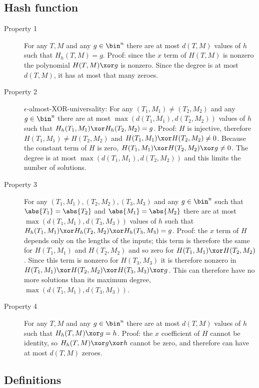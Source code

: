 \documentclass[letterpaper,11pt]{article}
\begin{document}
\subsection{Hash function}
\begin{description}
    \item[Property 1]
    For any \(T, M\) and any \(g \in \bin^n\)
    there are at most \(d(T, M)\)
    values of \(h\) such that \(H_h(T, M) = g\).
    Proof: since the \(x\) term of \(H(T, M)\) is nonzero
    the polynomial \(H(T, M) \xor g\) is nonzero.
    Since the degree is at most \(d(T, M)\), it has
    at most that many zeroes.
    \item[Property 2] 
    \(\epsilon\)-almost-XOR-universality: 
    For any \((T_1, M_1) \neq (T_2, M_2)\) and any \(g \in \bin^n\)
    there are at most \(\max(d(T_1, M_1), d(T_2, M_2))\)
    values of \(h\) such that \(H_h(T_1, M_1) \xor H_h(T_2, M_2) = g\).
    Proof: \(H\) is injective, therefore
    \(H(T_1, M_1) \neq H(T_2, M_2)\)
    and \(H(T_1, M_1) \xor H(T_2, M_2) \neq 0\).
    Because the constant term of \(H\) is zero, 
    \(H(T_1, M_1) \xor H(T_2, M_2) \xor g \neq 0\).
    The degree is at most \(\max(d(T_1, M_1), d(T_2, M_2))\)
    and this limits the number of solutions.
    \item[Property 3]
    For any \((T_1, M_1), (T_2, M_2), (T_3, M_3)\) and any \(g \in \bin^n\)
    such that \(\abs{T_1} = \abs{T_2}\) and \(\abs{M_1} = \abs{M_2}\)
    there are at most \(\max(d(T_1, M_1), d(T_3, M_3))\)
    values of \(h\) such that
    \(H_h(T_1, M_1) \xor H_h(T_2, M_2) \xor H_h(T_3, M_3) = g\).
    Proof: the \(x\) term of \(H\) depends only on
    the lengths of the inputs; this term is therefore the same for
    \(H(T_1, M_1)\) and \(H(T_2, M_2)\) and so zero for 
    \(H(T_1, M_1) \xor H(T_2, M_2)\). Since this term
    is nonzero for \(H(T_3, M_3)\) it is therefore
    nonzero in
    \(H(T_1, M_1) \xor H(T_2, M_2) \xor H(T_3, M_3) \xor g\).
    This can therefore have no more solutions than
    its maximum degree,
    \(\max(d(T_1, M_1), d(T_3, M_3))\).
    \item[Property 4]
    For any \(T, M\) and any \(g \in \bin^n\)
    there are at most \(d(T, M)\)
    values of \(h\) such that \(H_h(T, M) \xor g = h\).
    Proof: the \(x\) coefficient of \(H\) cannot be identity,
    so \(H_h(T, M) \xor g \xor h\) cannot be zero, and
    therefore can have at most \(d(T, M)\) zeroes.
\end{description}

\subsection{Definitions}
\end{document}
